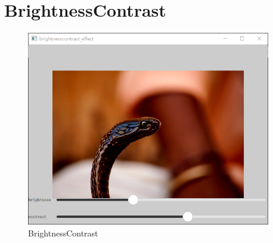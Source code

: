 ﻿

\FloatBarrier
\section{
BrightnessContrast
}\label{c000015s000003}




\begin{figure}[htb] %
\marginnote{\setlength\fboxsep{2pt}\fbox{\footnotesize{\kaishu\figurename\,}\footnotesize{\ref{p000019}}}}\centering %
\includegraphics[width=0.95\textwidth]{../chapter06/brightnesscontrast_effect/the_app.png} %
\caption{BrightnessContrast} %
\label{p000019} %
\end{figure}


